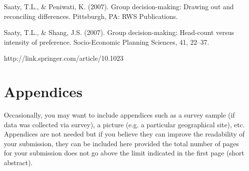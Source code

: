 \documentclass[11pt]{article}
\begin{document}
Saaty, T.L., \& Peniwati, K. (2007). Group decision-making: Drawing out and reconciling differences. Pittsburgh, PA: RWS Publications.

Saaty, T.L., \& Shang, J.S. (2007). Group decision-making: Head-count versus intensity of preference. Socio-Economic Planning Sciences, 41, 22–37.

http://link.springer.com/article/10.1023%





\section{Appendices}
Occasionally, you may want to include appendices such as a survey sample (if data was collected via survey), a picture (e.g. a particular geographical site), etc. Appendices are not needed but if you believe they can improve the readability of your submission, they can be included here provided the total number of pages for your submission does not go above the limit indicated in the first page (short abstract).
\end{document}
